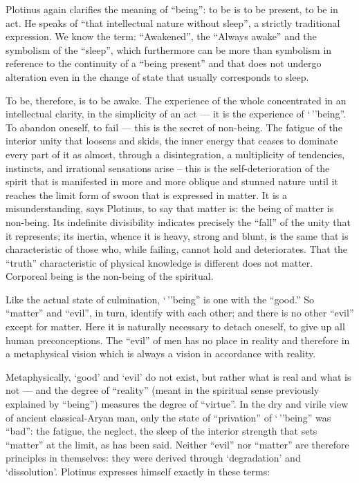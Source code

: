 Plotinus again clarifies the meaning of ``being'': to be is to be present, to be in act. He speaks of ``that intellectual nature without sleep'', a strictly traditional expression. We know the term: ``Awakened'', the ``Always awake'' and the symbolism of the ``sleep'', which furthermore can be more than symbolism in reference to the continuity of a ``being present'' and that does not undergo alteration even in the change of state that usually corresponds to sleep.

To be, therefore, is to be awake. The experience of the whole concentrated in an intellectual clarity, in the simplicity of an act --- it is the experience of `\,''being''. To abandon oneself, to fail --- this is the secret of non-being. The fatigue of the interior unity that loosens and skids, the inner energy that ceases to dominate every part of it as almost, through a disintegration, a multiplicity of tendencies, instincts, and irrational sensations arise -- this is the self-deterioration of the spirit that is manifested in more and more oblique and stunned nature until it reaches the limit form of swoon that is expressed in matter. It is a misunderstanding, says Plotinus, to say that matter is: the being of matter is non-being. Its indefinite divisibility indicates precisely the ``fall'' of the unity that it represents; its inertia, whence it is heavy, strong and blunt, is the same that is characteristic of those who, while failing, cannot hold and deteriorates. That the ``truth'' characteristic of physical knowledge is different does not matter. Corporeal being is the non-being of the spiritual.

Like the actual state of culmination, `\,''being'' is one with the ``good.'' So ``matter'' and ``evil'', in turn, identify with each other; and there is no other ``evil'' except for matter. Here it is naturally necessary to detach oneself, to give up all human preconceptions. The ``evil'' of men has no place in reality and therefore in a metaphysical vision which is always a vision in accordance with reality.

Metaphysically, `good' and `evil' do not exist, but rather what is real and what is not --- and the degree of ``reality'' (meant in the spiritual sense previously explained by ``being'') measures the degree of ``virtue''. In the dry and virile view of ancient classical-Aryan man, only the state of ``privation'' of `\,''being'' was ``bad'': the fatigue, the neglect, the sleep of the interior strength that sets ``matter'' at the limit, as has been said. Neither ``evil'' nor ``matter'' are therefore principles in themselves: they were derived through `degradation' and `dissolution'. Plotinus expresses himself exactly in these terms:

